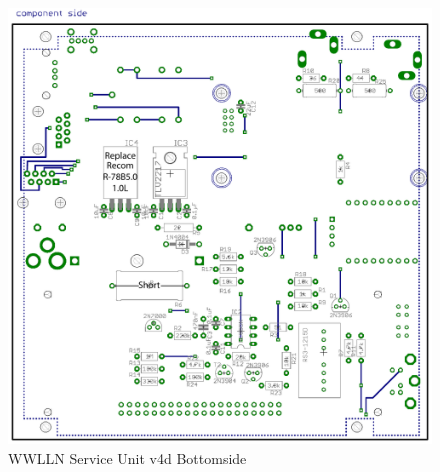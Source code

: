\begin{figure}[ht!]
   \centering
   \includegraphics[scale=.75]{Appendix/Figures/wwlln_SU_v4_bottom.pdf} 
   \caption{WWLLN Service Unit v4d Bottomside}
   \label{su:fig:suBot}
\end{figure}



